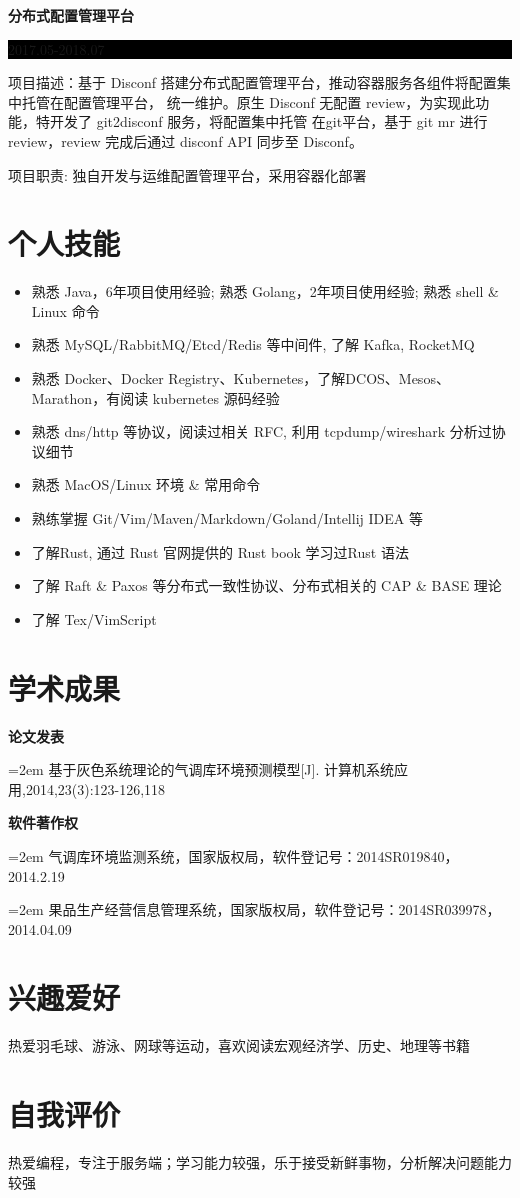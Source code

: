 \documentclass[paper=a4,fontsize=11pt]{scrartcl} %
\newcommand{\sepspace}{\vspace*{1em}}		%
\newcommand{\Section}[1]{\section*{ #1 }}          %
\newcommand{\SubSection}[2]{
	\sepspace \noindent \textbf{#1} \hfill      %
	\colorbox{Black}{\parbox{7em}{\hfill\color{White}#2}} \par  %
	\normalsize \par \sepspace}
\newcommand{\Academic}[2]{
		\noindent \textbf{#1} \par      %
		\hangindent=2em \small #2 %
		\normalsize \par}
\begin{document}
\begin{CJK}{UTF8}{gbsn}
\SubSection{分布式配置管理平台}{2017.05-2018.07}
项目描述：基于 Disconf 搭建分布式配置管理平台，推动容器服务各组件将配置集中托管在配置管理平台，
统一维护。原生 Disconf 无配置 review，为实现此功能，特开发了 git2disconf 服务，将配置集中托管
在git平台，基于 git mr 进行 review，review 完成后通过 disconf API 同步至 Disconf。\par
\sepspace
项目职责: 独自开发与运维配置管理平台，采用容器化部署

\Section{个人技能}

\begin{itemize}
    \item 熟悉 Java，6年项目使用经验; 熟悉 Golang，2年项目使用经验; 熟悉 shell \& Linux 命令
	\item 熟悉 MySQL/RabbitMQ/Etcd/Redis 等中间件, 了解 Kafka, RocketMQ
	\item 熟悉 Docker、Docker Registry、Kubernetes，了解DCOS、Mesos、Marathon，有阅读 kubernetes 源码经验
	\item 熟悉 dns/http 等协议，阅读过相关 RFC, 利用 tcpdump/wireshark 分析过协议细节
	\item 熟悉 MacOS/Linux 环境 \& 常用命令
	\item 熟练掌握 Git/Vim/Maven/Markdown/Goland/Intellij IDEA 等
    \item 了解Rust, 通过 Rust 官网提供的 Rust book 学习过Rust 语法
	\item 了解 Raft \& Paxos 等分布式一致性协议、分布式相关的 CAP \& BASE 理论
	\item 了解 Tex/VimScript
\end{itemize}

\Section{学术成果}

\Academic{论文发表}{基于灰色系统理论的气调库环境预测模型[J]. 计算机系统应用,2014,23(3):123-126,118}
\sepspace

\Academic{软件著作权}{气调库环境监测系统，国家版权局，软件登记号：2014SR019840，2014.2.19}
\Academic{}{果品生产经营信息管理系统，国家版权局，软件登记号：2014SR039978，2014.04.09}
\sepspace

\Section{兴趣爱好}
热爱羽毛球、游泳、网球等运动，喜欢阅读宏观经济学、历史、地理等书籍

\Section{自我评价}
热爱编程，专注于服务端；学习能力较强，乐于接受新鲜事物，分析解决问题能力较强
\end{CJK}     %
\end{document}
